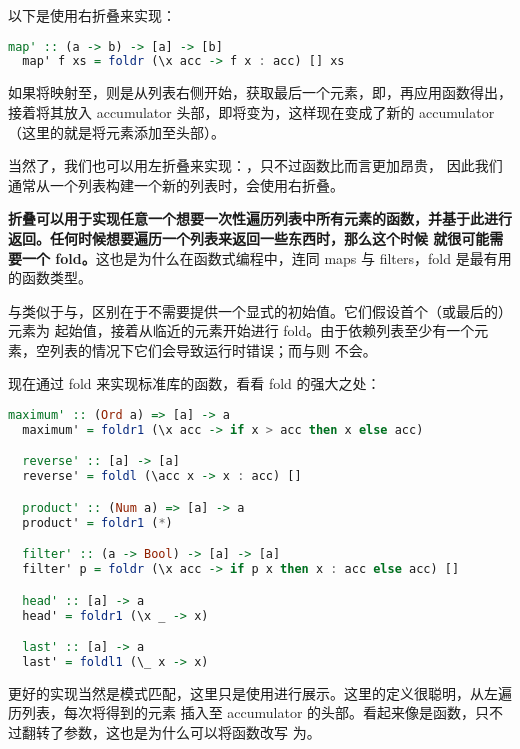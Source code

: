 \documentclass[./main.tex]{subfiles}
\begin{document}
以下是使用右折叠来实现：

\begin{lstlisting}[language=Haskell]
  map' :: (a -> b) -> [a] -> [b]
  map' f xs = foldr (\x acc -> f x : acc) [] xs
\end{lstlisting}

如果将映射至\acode{[1,2,3]}，则是从列表右侧开始，获取最后一个元素，即，再应用函数得出，接着将其放入 accumulator
头部，即将\acode{[]}变为，这样\acode{[6]}现在变成了新的 accumulator（这里的\acode{:}就是将元素添加至头部）。

当然了，我们也可以用左折叠来实现：，只不过\acode{++}函数比\acode{:}而言更加昂贵，
因此我们通常从一个列表构建一个新的列表时，会使用右折叠。

\textbf{折叠可以用于实现任意一个想要一次性遍历列表中所有元素的函数，并基于此进行返回。任何时候想要遍历一个列表来返回一些东西时，那么这个时候
  就很可能需要一个 fold。}这也是为什么在函数式编程中，连同 maps 与 filters，fold 是最有用的函数类型。

与类似于与，区别在于不需要提供一个显式的初始值。它们假设首个（或最后的）元素为
起始值，接着从临近的元素开始进行 fold。由于依赖列表至少有一个元素，空列表的情况下它们会导致运行时错误；而与则
不会。

现在通过 fold 来实现标准库的函数，看看 fold 的强大之处：

\begin{lstlisting}[language=Haskell]
  maximum' :: (Ord a) => [a] -> a
  maximum' = foldr1 (\x acc -> if x > acc then x else acc)

  reverse' :: [a] -> [a]
  reverse' = foldl (\acc x -> x : acc) []

  product' :: (Num a) => [a] -> a
  product' = foldr1 (*)

  filter' :: (a -> Bool) -> [a] -> [a]
  filter' p = foldr (\x acc -> if p x then x : acc else acc) []

  head' :: [a] -> a
  head' = foldr1 (\x _ -> x)

  last' :: [a] -> a
  last' = foldl1 (\_ x -> x)
\end{lstlisting}

更好的实现当然是模式匹配，这里只是使用进行展示。这里的定义很聪明，从左遍历列表，每次将得到的元素
插入至 accumulator 的头部。看起来像是\acode{:}函数，只不过翻转了参数，这也是为什么可以将函数改写
为。
\end{document}

